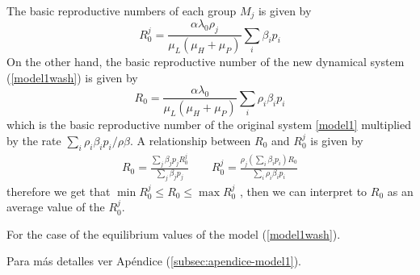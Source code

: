 \documentclass[12pt,a4paper]{article}
\theoremstyle{plain}%
\theoremstyle{definition}
\theoremstyle{remark}
\begin{document}
	The basic reproductive numbers of each group $M_j$ is given by
	\begin{equation}
	R_{0}^j=\frac{ \alpha \lambda_0 \rho_j}{\mu_L(\mu_{H}+\mu_P)} \sum_i\beta_i p_i 
	\end{equation}
	On the other hand, the basic reproductive number of the new dynamical system (\ref{model1wash}) is given by
	\begin{equation}
	R_0=\frac{ \alpha \lambda_0 }{ \mu_L (\mu_H+\mu_P)} \sum_i \rho_i \beta_i p_i 
	\end{equation}
	which is the basic reproductive number of the original system \eqref{model1} multiplied by the rate $\sum_i \rho_i \beta_i p_i/\rho\beta$.
	A relationship between $R_0$ and $R_0^j$ is given by
	\begin{equation}
	\begin{split}
		R_{0}=\frac{\sum_j \beta_{j} p_j R_0^j}
	{\sum_j \beta_{j} p_j}   
	\qquad
	R_{0}^j=\frac{ \rho_j (\sum_i \beta_{i} p_i) R_0}
	{\sum_i \rho_i \beta_{i} p_i}
	\end{split}
	\end{equation}
	therefore we get that $\min R_0^j\leq R_0 \leq \max R_0^j$
	, then we can interpret to $R_0$ as an average value of the $R_0^j$.
	
	For the case of the equilibrium values of the model  (\ref{model1wash}).
	
	
	
	Para más detalles ver Apéndice (\ref{subsec:apendice-model1}).
	
	
	
\end{document}
